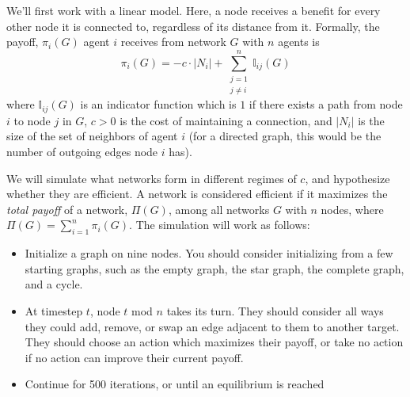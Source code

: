 \documentclass[11pt]{article}
\begin{document}
We'll first work with a linear model. Here, a node receives a benefit for every other node it is connected to, regardless of its distance from it. Formally, the payoff, $\pi_i(G)$ agent $i$ receives from network $G$ with $n$ agents is $$\pi_i(G)= - c \cdot | N_i | + \sum_{\substack{j=1 \\ j\neq i}}^{n} \mathbb{I}_{ij}(G)$$
where $\mathbb{I}_{ij}(G)$ is an indicator function which is $1$ if there exists a path from node $i$ to node $j$ in $G$, $c > 0$ is the cost of maintaining a connection, and $|N_i|$ is the size of the set of neighbors of agent $i$ (for a directed graph, this would be the number of outgoing edges node $i$ has).

We will simulate what networks form in different regimes of $c$, and hypothesize whether they are efficient. A network is considered efficient if it maximizes the \emph{total payoff} of a network, $\Pi(G)$, among all networks $G$ with $n$ nodes, where $\Pi(G)=\sum_{i=1}^n \pi_i(G).$ The simulation will work as follows:

\begin{itemize}
    \item Initialize a graph on nine nodes. You should consider initializing from a few starting graphs, such as the empty graph, the star graph, the complete graph, and a cycle.
    \item At timestep $t$, node $t$ mod $n$ takes its turn. They should consider all ways they could add, remove, or swap an edge adjacent to them to another target. They should choose an action which maximizes their payoff, or take no action if no action can improve their current payoff. 
    \item Continue for 500 iterations, or until an equilibrium is reached
\end{itemize}
\end{document}
